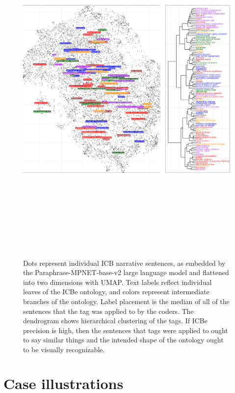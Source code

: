 \documentclass{article}
\begin{document}
\begin{figure}
\hypertarget{fig-umap}{%
\centering
\includegraphics[width=7in,height=7in]{p_semantic_embeddings_dendro.png}
\caption{Dots represent individual ICB narrative sentences, as embedded
by the Paraphrase-MPNET-base-v2 large language model and flattened into
two dimensions with UMAP. Text labels reflect individual leaves of the
ICBe ontology, and colors represent intermediate branches of the
ontology. Label placement is the median of all of the sentences that the
tag was applied to by the coders. The dendrogram shows hierarchical
clustering of the tags. If ICBe precision is high, then the sentences
that tags were applied to ought to say similar things and the intended
shape of the ontology ought to be visually
recognizable.}\label{fig-umap}
}
\end{figure}

\hypertarget{case-illustrations}{%
\section{Case illustrations}\label{case-illustrations}}
\end{document}

